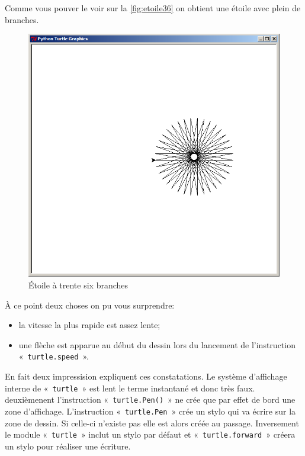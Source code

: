 Comme vous pouver le voir sur la \autoref{fig:etoile36} on obtient une étoile avec plein de branches.
\begin{figure}[h!]
\centering
\includegraphics[scale=0.4]{images/etoile36}
\caption{Étoile à trente six branches}\label{fig:etoile36}
\end{figure}

À ce point deux choses on pu vous surprendre:
\begin{itemize}
\item la vitesse la plus rapide est assez lente;
\item une flèche est apparue au début du dessin lors du lancement de l'instruction\\
«~\texttt{turtle.speed}~». 
\end{itemize}

En fait deux impressision expliquent ces constatations. Le système d'affichage interne de «~\texttt{turtle}~» est lent le terme instantané et donc très faux. deuxièmenent l'instruction «~\texttt{turtle.Pen()}~» ne crée que par effet de bord une zone d'affichage. L'instruction «~\texttt{turtle.Pen}~» crée un stylo qui va écrire sur la zone de dessin. Si celle-ci n'existe pas elle est alors créée au passage. Inversement le module «~\texttt{turtle}~» inclut un stylo par défaut et «~\texttt{turtle.forward}~» créera un stylo pour réaliser une écriture.

